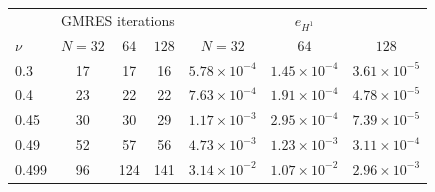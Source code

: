 \begin{tabular}{l ccc ccc}
\toprule
& \multicolumn{3}{c}{GMRES iterations} & \multicolumn{3}{c}{$e_{H^1}$}\\
$\nu$ & $N=32$ & $64$ & $128$ & $N=32$ & $64$ & $128$\\
\midrule
0.3 & 17 & 17 & 16 & $5.78{\times}10^{-4}$ & $1.45{\times}10^{-4}$ & $3.61{\times}10^{-5}$\\
0.4 & 23 & 22 & 22 & $7.63{\times}10^{-4}$ & $1.91{\times}10^{-4}$ & $4.78{\times}10^{-5}$\\
0.45 & 30 & 30 & 29 & $1.17{\times}10^{-3}$ & $2.95{\times}10^{-4}$ & $7.39{\times}10^{-5}$\\
0.49 & 52 & 57 & 56 & $4.73{\times}10^{-3}$ & $1.23{\times}10^{-3}$ & $3.11{\times}10^{-4}$\\
0.499 & 96 & 124 & 141 & $3.14{\times}10^{-2}$ & $1.07{\times}10^{-2}$ & $2.96{\times}10^{-3}$\\
\bottomrule
\end{tabular}

